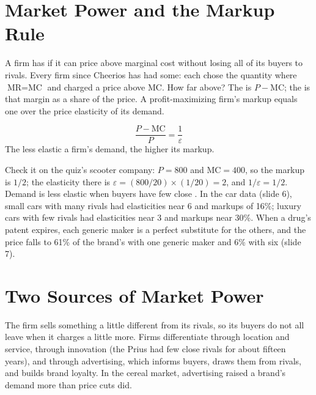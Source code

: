 \documentclass[11pt]{article}
\begin{document}

\section{Market Power and the Markup Rule}

A firm has  if it can price above marginal cost without losing all of its buyers to rivals. Every firm since Cheerios has had some: each chose the quantity where $\text{MR} = \text{MC}$ and charged a price above MC. How far above? The  is $P - \text{MC}$; the  is that margin as a share of the price. A profit-maximizing firm's markup equals one over the price elasticity of its demand.

\begin{keypanel}
\[
  \frac{P - \text{MC}}{P} = \frac{1}{\varepsilon}
\]
The less elastic a firm's demand, the higher its markup.
\end{keypanel}

Check it on the quiz's scooter company: $P = 800$ and $\text{MC} = 400$, so the markup is $1/2$; the elasticity there is $\varepsilon = (800/20) \times (1/20) = 2$, and $1/\varepsilon = 1/2$. Demand is less elastic when buyers have few close . In the car data (slide 6), small cars with many rivals had elasticities near 6 and markups of 16\%; luxury cars with few rivals had elasticities near 3 and markups near 30\%. When a drug's patent expires, each generic maker is a perfect substitute for the others, and the price falls to 61\% of the brand's with one generic maker and 6\% with six (slide 7).

\section{Two Sources of Market Power}

 The firm sells something a little different from its rivals, so its buyers do not all leave when it charges a little more. Firms differentiate through location and service, through innovation (the Prius had few close rivals for about fifteen years), and through advertising, which informs buyers, draws them from rivals, and builds brand loyalty. In the cereal market, advertising raised a brand's demand more than price cuts did.
\end{document}
